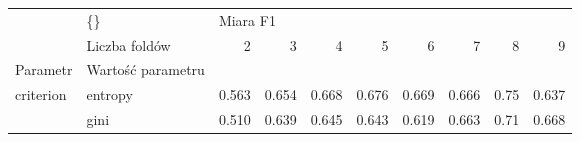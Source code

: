 \begin{tabular}{llrrrrrrrr}
\hline
          & \{\} & \multicolumn{8}{l}{Miara F1} \\
          & Liczba foldów &        2 &      3 &      4 &      5 &      6 &      7 &     8 &      9 \\
Parametr & Wartość parametru &          &        &        &        &        &        &       &        \\
\hline
criterion & entropy &    0.563 &  0.654 &  0.668 &  0.676 &  0.669 &  0.666 &  0.75 &  0.637 \\
          & gini &    0.510 &  0.639 &  0.645 &  0.643 &  0.619 &  0.663 &  0.71 &  0.668 \\
\hline
\end{tabular}
